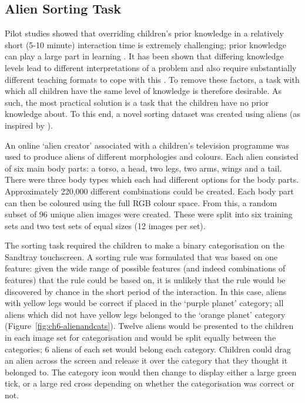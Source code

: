 \subsection{Alien Sorting Task}\label{sec:ch6-meth-sorttask}
Pilot studies showed that overriding children's prior knowledge in a relatively short (5-10 minute) interaction time is extremely challenging; prior knowledge can play a large part in learning \citep{smith1994misconceptions}. It has been shown that differing knowledge levels lead to different interpretations of a problem \citep{chi1981categorization} and also require substantially different teaching formats to cope with this \citep{kalyuga2008relative}.  To remove these factors, a task with which all children have the same level of knowledge is therefore desirable. As such, the most practical solution is a task that the children have no prior knowledge about. To this end, a novel sorting dataset was created using aliens (as inspired by \citealp{lupyan2007language}).

An online `alien creator' associated with a children's television programme was used to produce aliens of different morphologies and colours. Each alien consisted of six main body parts: a torso, a head, two legs, two arms, wings and a tail. There were three body types which each had different options for the body parts. Approximately 220,000 different combinations could be created. Each body part can then be coloured using the full RGB colour space. From this, a random subset of 96 unique alien images were created. These were split into six training sets and two test sets of equal sizes (12 images per set).

The sorting task required the children to make a binary categorisation on the Sandtray touchscreen. A sorting rule was formulated that was based on one feature: given the wide range of possible features (and indeed combinations of features) that the rule could be based on, it is unlikely that the rule would be discovered by chance in the short period of the interaction. In this case, aliens with yellow legs would be correct if placed in the `purple planet' category; all aliens which did not have yellow legs belonged to the `orange planet' category (Figure~\ref{fig:ch6-alienandcats}). Twelve aliens would be presented to the children in each image set for categorisation and would be split equally between the categories; 6 aliens of each set would belong each category. Children could drag an alien across the screen and release it over the category that they thought it belonged to. The category icon would then change to display either a large green tick, or a large red cross depending on whether the categorisation was correct or not.

